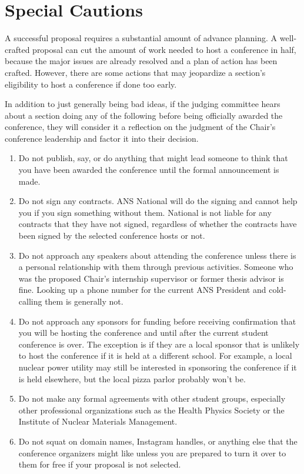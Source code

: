 \documentclass[12pt]{article}
\begin{document}
\section{Special Cautions}\label{sec:special_cautions}
A successful proposal requires a substantial amount of advance planning. A well-crafted proposal can cut the amount of work needed to host a conference in half, because the major issues are already resolved and a plan of action has been crafted.
However, there are some actions that may jeopardize a section's eligibility to host a conference if done too early.

In addition to just generally being bad ideas, if the judging committee hears about a section doing any of the following before being officially awarded the conference, they will consider it a reflection on the judgment of the Chair's conference leadership and factor it into their decision.

\begin{enumerate}
\item{Do not publish, say, or do anything that might lead someone to think that you have been awarded the conference until the formal announcement is made.}
\item{Do not sign any contracts. ANS National will do the signing and cannot help you if you sign something without them. National is not liable for any contracts that they have not signed, regardless of whether the contracts have been signed by the selected conference hosts or not.}
\item{Do not approach any speakers about attending the conference unless there is a personal relationship with them through previous activities. Someone who was the proposed Chair’s internship supervisor or former thesis advisor is fine. Looking up a phone number for the current ANS President and cold-calling them is generally not.}
\item{Do not approach any sponsors for funding before receiving confirmation that you will be hosting the conference and until after the current student conference is over. The exception is if they are a local sponsor that is unlikely to host the conference if it is held at a different school. For example, a local nuclear power utility may still be interested in sponsoring the conference if it is held elsewhere, but the local pizza parlor probably won't be.}
\item{Do not make any formal agreements with other student groups, especially other professional organizations such as the Health Physics Society or the Institute of Nuclear Materials Management.}
\item{Do not squat on domain names, Instagram handles, or anything else that the conference organizers might like unless you are prepared to turn it over to them for free if your proposal is not selected.}
\end{enumerate}
\end{document}
